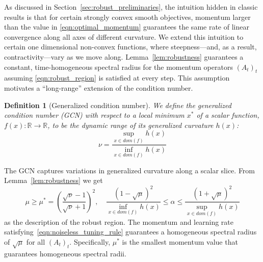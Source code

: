 \documentclass{article} %
\newtheorem{definition}[theorem]{Definition}
\newcommand{\mat}[1]{\bm{\mathit{#1}}}
\begin{document}
As discussed in Section~\ref{sec:robust_preliminaries}, the intuition hidden in classic results
is that for certain strongly convex smooth objectives, momentum larger than the value in \eqref{eqn:optimal_momentum} guarantees the same rate of linear convergence along all axes of different curvature. 
We extend this intuition to certain one dimensional non-convex functions, where steepness---and, as a result, contractivity---vary as we move along.
Lemma~\ref{lem:robustness} guarantees a constant, time-homogeneous spectral radius for the momentum operators $(\mat{A}_t)_t$ 
assuming \eqref{eqn:robust_region} is satisfied at every step. 
This assumption motivates a ``long-range'' extension of the condition number.
\begin{definition}[Generalized condition number]
We define the generalized condition number (GCN) with respect to a local minimum $x^*$ of a scalar function, $f(x):\mathbb{R}\rightarrow \mathbb{R}$, to be the dynamic range of its generalized curvature $h(x)$:
\begin{equation}
	\nu = \frac{\sup_{x \in dom(f)} h(x)}{ \inf_{x \in dom(f)} h(x)}
\end{equation}
\end{definition}
The GCN captures variations in generalized curvature along a scalar slice.
From Lemma~\ref{lem:robustness} we get
\begin{equation}
	\mu \geq \mu^* = \left(\frac{\sqrt{\nu}-1}{\sqrt{\nu}+1}\right)^2,
	\quad
	\frac{(1-\sqrt{\mu})^2}{\inf_{x \in dom(f)}h(x)} \leq \alpha \leq \frac{(1+\sqrt{\mu})^2}{\sup_{x \in dom(f)}h(x)}
	\label{eqn:noiseless_tuning_rule}
\end{equation}
as the description of the robust region. The momentum and learning rate satisfying~\eqref{eqn:noiseless_tuning_rule} guarantees a homogeneous spectral radius of $\sqrt{\mu}$ for all $(\mat{A}_t)_t$.
Specifically, $\mu^*$ is the smallest momentum value that guarantees homogeneous spectral radii.
\end{document}

